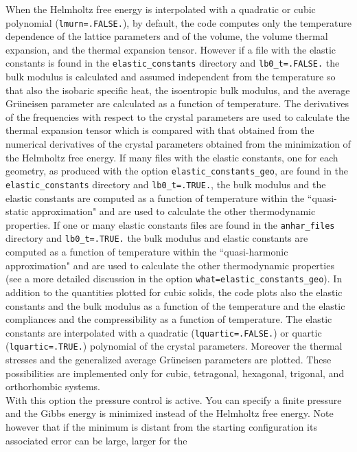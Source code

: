 \documentclass[12pt,a4paper,twoside]{report}
\begin{document}
When the Helmholtz free energy is interpolated with a quadratic or cubic
polynomial (\texttt{lmurn=.FALSE.}), by default, the code computes only 
the temperature dependence of the lattice parameters and of the volume, the 
volume thermal expansion, and the thermal expansion tensor. However if a file 
with the elastic constants is found in the \texttt{elastic\_constants}
directory 
and \texttt{lb0\_t=.FALSE.} the bulk modulus is calculated and 
assumed independent from the temperature so that also the isobaric specific 
heat, the isoentropic bulk modulus, and the average Gr\"uneisen parameter 
are calculated as a function of temperature. The derivatives of the 
frequencies with respect to the crystal parameters are used to calculate 
the thermal expansion tensor which 
is compared with that obtained from the numerical derivatives of the 
crystal parameters obtained from the minimization of the Helmholtz free energy.
If many files with the elastic constants, one for each geometry, as
produced with the option \texttt{elastic\_constants\_geo}, are found
in the \texttt{elastic\_constants} directory and \texttt{lb0\_t=.TRUE.}, the bulk modulus and 
the elastic constants
are computed as a function of temperature within the ``quasi-static
approximation" and are used
to calculate the other thermodynamic properties. 
If one or many elastic constants files are found in the 
\texttt{anhar\_files} directory and \texttt{lb0\_t=.TRUE.} the bulk modulus 
and elastic constants are computed as a function of temperature 
within the ``quasi-harmonic approximation" and are used
to calculate the other thermodynamic properties (see a more detailed
discussion in the option \texttt{what=elastic\_constants\_geo}).
In addition to the
quantities plotted for cubic solids, the code plots also the elastic
constants and the bulk modulus as a function of the temperature and
the elastic compliances and the compressibility as a function of temperature.
The elastic constants are interpolated with a quadratic 
(\texttt{lquartic=.FALSE.}) or quartic (\texttt{lquartic=.TRUE.}) polynomial
of the crystal parameters.
Moreover the thermal stresses and the generalized average Gr\"uneisen
parameters are plotted.
These possibilities are implemented only for cubic, tetragonal, 
hexagonal, trigonal, and orthorhombic systems. \\
With this option the pressure control is active. You can specify a
finite pressure and the Gibbs energy is minimized instead of the
Helmholtz free energy. Note however that if the minimum is distant from 
the starting configuration its associated error can be large, larger for the
\end{document}
